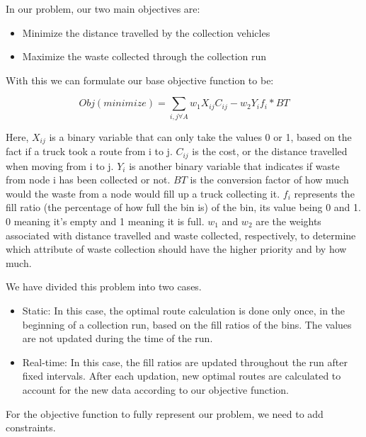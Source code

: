 \documentclass[12pt]{article}
\begin{document}
In our problem, our two main objectives are:
\begin{itemize}
    \item Minimize the distance travelled by the collection vehicles
    \item Maximize the waste collected through the collection run
\end{itemize}

With this we can formulate our base objective function to be:

\begin{equation}\label{eq1}
    Obj(minimize)=\sum_{i,j \forall A} w_1 X_{ij} C_{ij} - w_2 Y_i f_i * BT
\end{equation}

Here, $X_{ij}$ is a binary variable that can only take the values 0 or 1, based on the fact if a truck took a route from i to j. $C_{ij}$ is the cost, or the distance travelled when moving from i to j. $Y_{i}$ is another binary variable that indicates if waste from node i has been collected or not. $BT$ is the conversion factor of how much would the waste from a node would fill up a truck collecting it. $f_i$ represents the fill ratio (the percentage of how full the bin is) of the bin, its value being 0 and 1. 0 meaning it's empty and 1 meaning it is full. $w_1$ and $w_2$ are the weights associated with distance travelled and waste collected, respectively, to determine which attribute of waste collection should have the higher priority and by how much. 

We have divided this problem into two cases.
\begin{itemize}
    \item Static: In this case, the optimal route calculation is done only once, in the beginning of a collection run, based on the fill ratios of the bins. The values are not updated during the time of the run.
    \item Real-time: In this case, the fill ratios are updated throughout the run after fixed intervals. After each updation, new optimal routes are calculated to account for the new data according to our objective function.
\end{itemize}

For the objective function to fully represent our problem, we need to add constraints.
\end{document}
